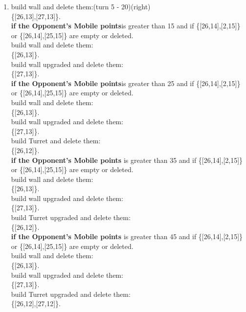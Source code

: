 \documentclass[12pt]{article}
\begin{document}
\begin{enumerate}
\begin{enumerate}
\item build wall and delete them:(turn 5 - 20)(right)\\ \{[26,13],[27,13]\}. \\ \textbf{if the Opponent's Mobile points}is greater than 15 and if \{[26,14],[2,15]\} or \{[26,14],[25,15]\} are empty or deleted. \\ build wall and delete them:\\ \{[26,13]\}.\\  build wall upgraded and delete them:\\ \{[27,13]\}.\\ \textbf{if the Opponent's Mobile points}is greater than 25 and if \{[26,14],[2,15]\} or \{[26,14],[25,15]\} are empty or deleted. \\ build wall and delete them:\\ \{[26,13]\}.\\  build wall upgraded and delete them:\\ \{[27,13]\}.\\build Turret and delete them:\\ \{[26,12]\}.\\ \textbf{if the Opponent's Mobile points} is greater than 35 and if \{[26,14],[2,15]\} or \{[26,14],[25,15]\} are empty or deleted. \\ build wall and delete them:\\ \{[26,13]\}.\\  build wall upgraded and delete them:\\ \{[27,13]\}.\\build Turret upgraded and delete them:\\ \{[26,12]\}. \\ \textbf{if the Opponent's Mobile points} is greater than 45 and if \{[26,14],[2,15]\} or \{[26,14],[25,15]\} are empty or deleted. \\ build wall and delete them:\\ \{[26,13]\}.\\  build wall upgraded and delete them:\\ \{[27,13]\}.\\build Turret upgraded and delete them:\\ \{[26,12],[27,12]\}.
\end{enumerate}
\end{enumerate}
\end{document}
